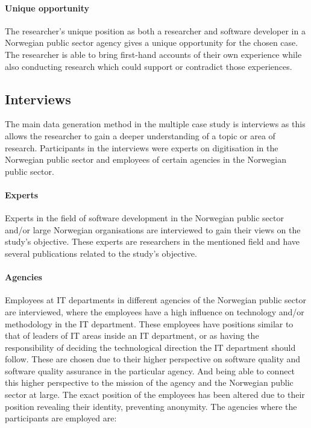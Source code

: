 \paragraph{Unique opportunity}
The researcher's unique position as both a researcher and software developer in a Norwegian public sector agency gives a unique opportunity for the chosen case. The researcher is able to bring first-hand accounts of their own experience while also conducting research which could support or contradict those experiences.

\subsection{Interviews}
The main data generation method in the multiple case study is interviews as this allows the researcher to gain a deeper understanding of a topic or area of research. Participants in the interviews were experts on digitisation in the Norwegian public sector and employees of certain agencies in the Norwegian public sector. 

\paragraph{Experts}
Experts in the field of software development in the Norwegian public sector and/or large Norwegian organisations are interviewed to gain their views on the study's objective. These experts are researchers in the mentioned field and have several publications related to the study's objective.

\paragraph{Agencies}
Employees at IT departments in different agencies of the Norwegian public sector are interviewed, where the employees have a high influence on technology and/or methodology in the IT department. These employees have positions similar to that of leaders of IT areas inside an IT department, or as having the responsibility of deciding the technological direction the IT department should follow. These are chosen due to their higher perspective on software quality and software quality assurance in the particular agency. And being able to connect this higher perspective to the mission of the agency and the Norwegian public sector at large. The exact position of the employees has been altered due to their position revealing their identity, preventing anonymity. The agencies where the participants are employed are:

